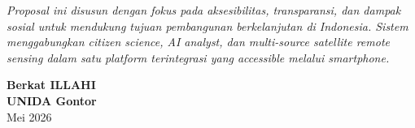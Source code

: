 \documentclass[12pt,a4paper]{article}
\begin{document}
\begin{center}
  \textit{Proposal ini disusun dengan fokus pada aksesibilitas, transparansi, dan dampak sosial untuk mendukung tujuan pembangunan berkelanjutan di Indonesia. Sistem menggabungkan citizen science, AI analyst, dan multi-source satellite remote sensing dalam satu platform terintegrasi yang accessible melalui smartphone.}
\end{center}

\vspace{1cm}

\begin{flushright}
  \textbf{Berkat ILLAHI} \\
  \textbf{UNIDA Gontor} \\
  Mei 2026
\end{flushright}
\end{document}
